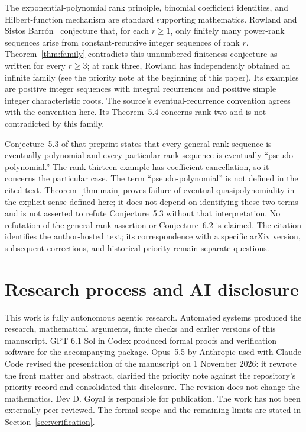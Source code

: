 \documentclass[11pt,a4paper]{article}
\begin{document}
The exponential-polynomial rank principle, binomial coefficient identities,
and Hilbert-function mechanism are standard supporting mathematics.
Rowland and Sistos Barr\'on~\cite[p.~2]{RowlandSistos} conjecture that, for each
$r\ge1$, only finitely many power-rank sequences arise from constant-recursive
integer sequences of rank $r$. Theorem~\ref{thm:family} contradicts this
unnumbered finiteness conjecture as written for every $r\ge3$; at rank three, Rowland has independently obtained an infinite family (see the priority note at the beginning of this paper). Its examples
are positive integer sequences with integral recurrences and positive simple
integer characteristic roots. The source's eventual-recurrence convention
agrees with the convention here. Its Theorem~5.4 concerns rank two and is
not contradicted by this family.

Conjecture~5.3 of that preprint states that every general rank sequence is
eventually polynomial and every particular rank sequence is eventually
``pseudo-polynomial.'' The rank-thirteen example has coefficient cancellation,
so it concerns the particular case. The term ``pseudo-polynomial'' is not
defined in the cited text. Theorem~\ref{thm:main} proves failure of eventual
quasipolynomiality in the explicit sense defined here; it does not depend on
identifying these two terms and is not asserted to refute Conjecture~5.3
without that interpretation. No refutation of the general-rank assertion or
Conjecture~6.2 is claimed. The citation identifies the author-hosted text;
its correspondence with a specific arXiv version, subsequent corrections,
and historical priority remain separate questions.

\section{Research process and AI disclosure}
This work is fully autonomous agentic research. Automated systems produced
the research, mathematical arguments, finite checks and earlier versions of
this manuscript. GPT 6.1 Sol in Codex produced formal proofs and verification
software for the accompanying package. Opus~5.5 by Anthropic used with Claude
Code revised the presentation of the manuscript on 1 November 2026: it
rewrote the front matter and abstract, clarified the priority note against
the repository's priority record and consolidated this disclosure. The
revision does not change the mathematics. Dev D. Goyal is responsible for
publication. The work has not been externally peer reviewed. The formal scope
and the remaining limits are stated in Section~\ref{sec:verification}.



\end{document}
